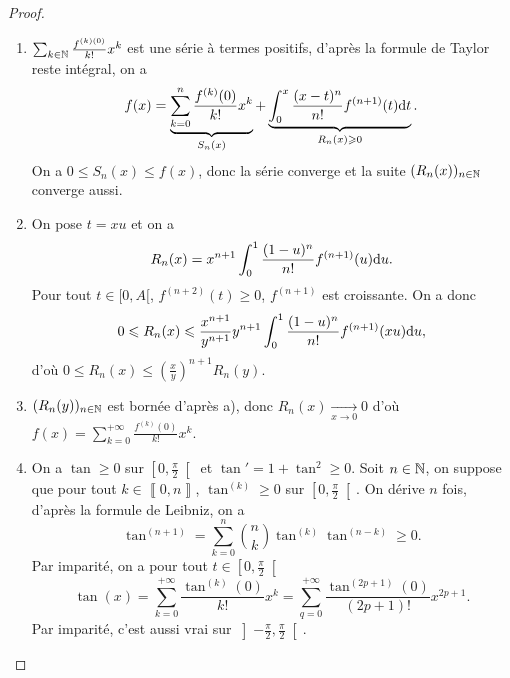 \documentclass[12pt]{article}
\begin{document}
\begin{proof}
    \phantom{}
    \begin{enumerate}
        \item $\sum_{k\in\mathbb{N}}\frac{f^{(k)(0)}}{k!}x^{k}$ est une série à termes positifs, d'après la formule de Taylor reste intégral, on a 
        \begin{equation}
            f(x)=\underbrace{\sum_{k=0}^{n}\frac{f^{(k)}(0)}{k!}x^{k}}_{S_n(x)}+\underbrace{\int_{0}^{x}\frac{(x-t)^{n}}{n!}f^{(n+1)}(t)\mathrm{d} t}_{R_n(x)\geqslant0}.
        \end{equation}
        On a $0\leqslant S_n(x)\leqslant f(x)$, donc la série converge et la suite $(R_n(x))_{n\in\mathbb{N}}$ converge aussi.

        \item On pose $t=xu$ et on a 
        \begin{equation}
            R_n(x)=x^{n+1}\int_{0}^{1}\frac{(1-u)^{n}}{n!}f^{(n+1)}(u)\mathrm{d} u.
        \end{equation}
        Pour tout $t\in[0,A[$, $f^{(n+2)}(t)\geqslant0$, $f^{(n+1)}$ est croissante. On a donc 
        \begin{equation}
            0\leqslant R_n(x)\leqslant\frac{x^{n+1}}{y^{n+1}}y^{n+1}\int_{0}^{1}\frac{(1-u)^{n}}{n!}f^{(n+1)}(xu)\mathrm{d} u,    
        \end{equation}
        d'où $0\leqslant R_n(x)\leqslant\left(\frac{x}{y}\right)^{n+1}R_n(y)$.

        \item $(R_n(y))_{n\in\mathbb{N}}$ est bornée d'après a), donc $R_n(x)\xrightarrow[x\to0]{}0$ d'où $f(x)=\sum_{k=0}^{+\infty}\frac{f^{(k)}(0)}{k!}x^{k}$.
        
        \item On a $\tan\geqslant0$ sur $\left[0,\frac{\pi}{2}\right[$ et $\tan'=1+\tan^{2}\geqslant0$. Soit $n\in\mathbb{N}$, on suppose que pour tout $k\in\left\llbracket0,n\right\rrbracket$, $\tan^{(k)}\geqslant0$ sur $\left[0,\frac{\pi}{2}\right[$. On dérive $n$ fois, d'après la formule de Leibniz, on a 
        \begin{equation}
            \tan^{(n+1)}=\sum_{k=0}^{n}\binom{n}{k}\tan^{(k)}\tan^{(n-k)}\geqslant0.
        \end{equation}
        Par imparité, on a pour tout $t\in\left[0,\frac{\pi}{2}\right[$
        \begin{equation}
            \tan(x)=\sum_{k=0}^{+\infty}\frac{\tan^{(k)}(0)}{k!}x^{k}=\sum_{q=0}^{+\infty}\frac{\tan^{(2p+1)}(0)}{(2p+1)!}x^{2p+1}.
        \end{equation}
        Par imparité, c'est aussi vrai sur $\left]-\frac{\pi}{2},\frac{\pi}{2}\right[$.
    \end{enumerate}
\end{proof}
\end{document}
